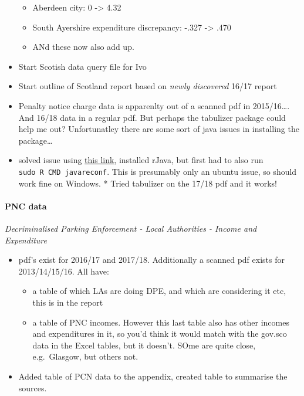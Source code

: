 \documentclass[]{article}
\providecommand{\tightlist}{%
  \setlength{\itemsep}{0pt}\setlength{\parskip}{0pt}}
\let\oldparagraph\paragraph
\renewcommand{\paragraph}[1]{\oldparagraph{#1}\mbox{}}
\begin{document}
\begin{itemize}
  \begin{itemize}
  \tightlist
  \item
    Aberdeen city: 0 -\textgreater{} 4.32
  \item
    South Ayershire expenditure discrepancy: -.327 -\textgreater{} .470
  \item
    ANd these now also add up.
  \end{itemize}
\item
  Start Scotish data query file for Ivo
\item
  Start outline of Scotland report based on \emph{newly discovered}
  16/17 report
\item
  Penalty notice charge data is apparenlty out of a scanned pdf in
  2015/16\ldots{}. And 16/18 data in a regular pdf. But perhaps the
  tabulizer package could help me out? Unfortunatley there are some sort
  of java issues in installing the package\ldots{}
\item
  solved issue using
  \href{https://stackoverflow.com/questions/51256462/r-cannot-install-rjava-what-is-r-api-3-4/51267282\#51267282}{this
  link}, installed rJava, but first had to also run
  \texttt{sudo\ R\ CMD\ javareconf}. This is presumably only an ubuntu
  issue, so should work fine on Windows. * Tried tabulizer on the 17/18
  pdf and it works!
\end{itemize}

\hypertarget{pnc-data}{%
\paragraph{PNC data}\label{pnc-data}}

\emph{Decriminalised Parking Enforcement - Local Authorities - Income
and Expenditure}

\begin{itemize}
\tightlist
\item
  pdf's exist for 2016/17 and 2017/18. Additionally a scanned pdf exists
  for 2013/14/15/16. All have:

  \begin{itemize}
  \tightlist
  \item
    a table of which LAs are doing DPE, and which are considering it
    etc, this is in the report
  \item
    a table of PNC incomes. However this last table also has other
    incomes and expenditures in it, so you'd think it would match with
    the gov.sco data in the Excel tables, but it doesn't. SOme are quite
    close, e.g.~Glasgow, but others not.\\
  \end{itemize}
\item
  Added table of PCN data to the appendix, created table to summarise
  the sources.
\end{itemize}
\end{document}
